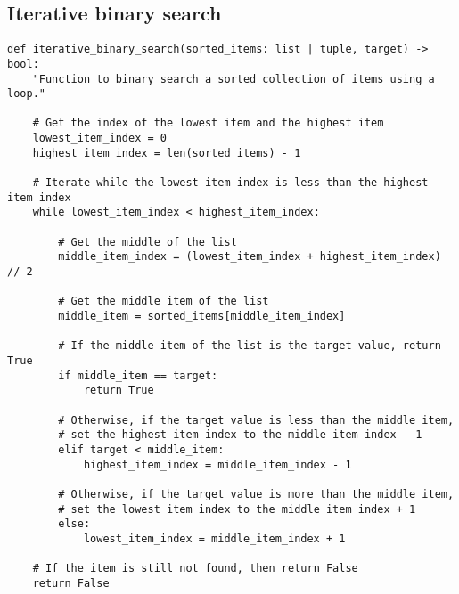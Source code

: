 \documentclass[11pt]{article}
\begin{document}
\subsection{Iterative binary search}
\label{sec:org2a85b00}
\begin{verbatim}
def iterative_binary_search(sorted_items: list | tuple, target) -> bool:
    "Function to binary search a sorted collection of items using a loop."

    # Get the index of the lowest item and the highest item
    lowest_item_index = 0
    highest_item_index = len(sorted_items) - 1

    # Iterate while the lowest item index is less than the highest item index
    while lowest_item_index < highest_item_index:

        # Get the middle of the list
        middle_item_index = (lowest_item_index + highest_item_index) // 2

        # Get the middle item of the list
        middle_item = sorted_items[middle_item_index]

        # If the middle item of the list is the target value, return True
        if middle_item == target:
            return True

        # Otherwise, if the target value is less than the middle item,
        # set the highest item index to the middle item index - 1
        elif target < middle_item:
            highest_item_index = middle_item_index - 1

        # Otherwise, if the target value is more than the middle item,
        # set the lowest item index to the middle item index + 1
        else:
            lowest_item_index = middle_item_index + 1

    # If the item is still not found, then return False
    return False
\end{verbatim}

 \newpage
\end{document}
